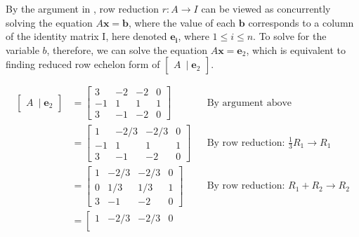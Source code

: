 \documentclass[10pt,letterpaper,final]{report}
\newcommand{\reason}[1]{&& \text{#1}}
\begin{document}
By the argument in \textcite[Ch. 2.2, p.~117]{LayEtAl2020LinearAlgebraAndItsApplications}, row reduction $r: A \to I$ can be viewed as concurrently solving the equation $A\mathbf{x} = \mathbf{b}$, where the value of each $\mathbf{b}$ corresponds to a column of the identity matrix I, here denoted $\mathbf{e_i}$, where $1 \le i \le n$. To solve for the variable $b$, therefore, we can solve the equation $A\mathbf{x} = \mathbf{e}_2$, which is equivalent to finding reduced row echelon form of $\begin{bmatrix}
    A\ \mid \mathbf{e}_2
  \end{bmatrix}$.

\begin{align*}
  \begin{bmatrix}
    A\ \mid \mathbf{e}_2
  \end{bmatrix} & =
  \left[\begin{array}{rrr|r}
      3  & -2 & -2 & 0 \\
      -1 & 1  & 1  & 1 \\
      3  & -1 & -2 & 0
    \end{array}\right] \reason{By argument above}                                                                            \\[1ex]
                         & = \left[\begin{array}{rrr|r}
                                 1  & -2/3 & -2/3 & 0 \\
                                 -1 & 1    & 1    & 1 \\
                                 3  & -1   & -2   & 0
                               \end{array}\right] \reason{By row reduction: $\frac{1}{3}R_1 \to R_1$}                        \\[1ex]
                         & = \left[\begin{array}{rrr|r}
                                 1 & -2/3 & -2/3 & 0 \\
                                 0 & 1/3  & 1/3  & 1 \\
                                 3 & -1   & -2   & 0
                               \end{array}\right] \reason{By row reduction: $R_1 + R_2 \to R_2$}                             \\[1ex]
                         & = \left[\begin{array}{rrr|r}
                                 1 & -2/3 & -2/3 & 0 \\

\end{array}
\end{align*}
\end{document}
